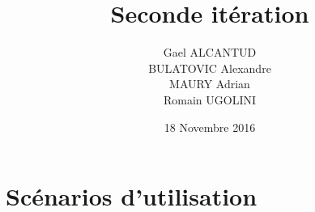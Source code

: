 \documentclass[a4paper, 12pt]{article}
\title{Seconde itération}
\author{Gael ALCANTUD \\
  BULATOVIC Alexandre \\
  MAURY Adrian \\
  Romain UGOLINI}
\date{18 Novembre 2016}
\begin{document}
\maketitle
\tableofcontents
\section{Scénarios d'utilisation}

\end{document}
